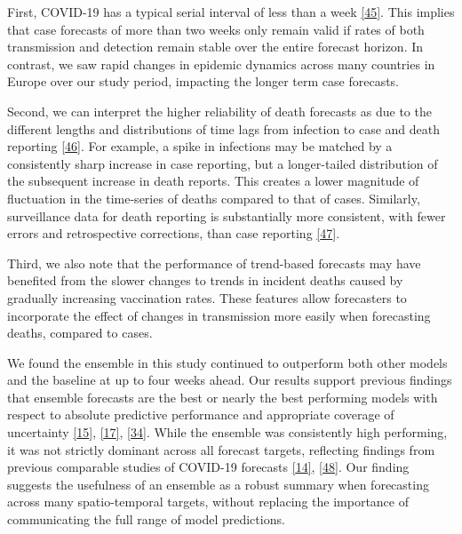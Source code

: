\documentclass[
]{article}
\begin{document}
First, COVID-19 has a typical serial interval of less than a week \protect\hyperlink{ref-aleneSerialIntervalIncubation2021}{{[}45{]}}. This implies that case forecasts of more than two weeks only remain valid if rates of both transmission and detection remain stable over the entire forecast horizon. In contrast, we saw rapid changes in epidemic dynamics across many countries in Europe over our study period, impacting the longer term case forecasts.

Second, we can interpret the higher reliability of death forecasts as due to the different lengths and distributions of time lags from infection to case and death reporting \protect\hyperlink{ref-jinLagDailyReported2021}{{[}46{]}}. For example, a spike in infections may be matched by a consistently sharp increase in case reporting, but a longer-tailed distribution of the subsequent increase in death reports. This creates a lower magnitude of fluctuation in the time-series of deaths compared to that of cases. Similarly, surveillance data for death reporting is substantially more consistent, with fewer errors and retrospective corrections, than case reporting \protect\hyperlink{ref-catalaRobustEstimationDiagnostic2021}{{[}47{]}}.

Third, we also note that the performance of trend-based forecasts may have benefited from the slower changes to trends in incident deaths caused by gradually increasing vaccination rates. These features allow forecasters to incorporate the effect of changes in transmission more easily when forecasting deaths, compared to cases.

We found the ensemble in this study continued to outperform both other models and the baseline at up to four weeks ahead. Our results support previous findings that ensemble forecasts are the best or nearly the best performing models with respect to absolute predictive performance and appropriate coverage of uncertainty \protect\hyperlink{ref-funkShorttermForecastsInform2020}{{[}15{]}}, \protect\hyperlink{ref-viboudRAPIDDEbolaForecasting2018}{{[}17{]}}, \protect\hyperlink{ref-cramerEvaluationIndividualEnsemble2021}{{[}34{]}}. While the ensemble was consistently high performing, it was not strictly dominant across all forecast targets, reflecting findings from previous comparable studies of COVID-19 forecasts \protect\hyperlink{ref-bracherPreregisteredShorttermForecasting2021}{{[}14{]}}, \protect\hyperlink{ref-brooksComparingEnsembleApproaches2020}{{[}48{]}}. Our finding suggests the usefulness of an ensemble as a robust summary when forecasting across many spatio-temporal targets, without replacing the importance of communicating the full range of model predictions.
\end{document}
